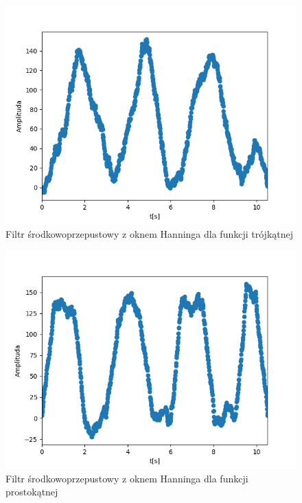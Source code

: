 \documentclass[12pt]{article}
\begin{document}
\begin{figure}[H]
\centering
\includegraphics[scale=0.6]{filtrSrodekHanningTrojkat.png}
\caption{Filtr środkowoprzepustowy z oknem Hanninga dla funkcji trójkątnej}
\end{figure}

\begin{figure}[H]
\centering
\includegraphics[scale=0.6]{filtrSrodekHanningProstokat.png}
\caption{Filtr środkowoprzepustowy z oknem Hanninga dla funkcji prostokątnej}
\end{figure}
\end{document}
